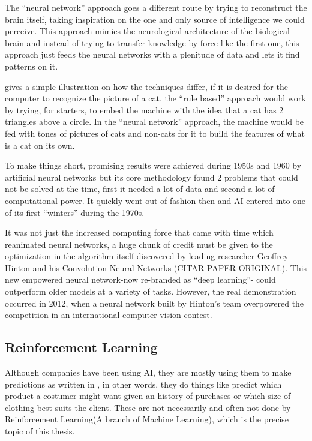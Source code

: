 The ``neural network'' approach goes a different route by trying to reconstruct the brain itself, taking inspiration on the one and only source of intelligence we could perceive. This approach mimics the neurological architecture of the biological brain and instead of trying to transfer knowledge by force like the first one, this approach just feeds the neural networks with a plenitude of data and lets it find patterns on it.

\cite{AISuperPowers2018} gives a simple illustration on how the techniques differ, if it is desired for the computer to recognize the picture of a cat, the ``rule based'' approach would work by trying, for starters, to embed the machine with the idea that a cat has 2 triangles above a circle. In the ``neural network'' approach, the machine would be fed with tones of pictures of cats and non-cats for it to build the features of what is a cat on its own.

To make things short, promising results were achieved during 1950s and 1960 by artificial neural networks but its core methodology found 2 problems that could not be solved at the time, first it needed a lot of data and second a lot of computational power. It quickly went out of fashion then and AI entered into one of its first ``winters'' during the 1970s.

It was not just the increased computing force that came with time which reanimated neural networks, a huge chunk of credit must be given to the optimization in the algorithm itself discovered by leading researcher Geoffrey Hinton and his Convolution Neural Networks (CITAR PAPER ORIGINAL). This new empowered neural network-now re-branded as ``deep learning''- could outperform older models at a variety of tasks. However, the real demonstration occurred in 2012, when a neural network built by Hinton's team overpowered the competition in an international computer vision contest.

\subsection{Reinforcement Learning}
Although companies have been using AI, they are mostly using them to make predictions as written in \cite{PredictionMachines2018}, in other words, they do things like predict which product a costumer might want given an history of purchases or which size of clothing best suits the client. These are not necessarily and often not done  by Reinforcement Learning(A branch of Machine Learning), which is the precise topic of this thesis. 


